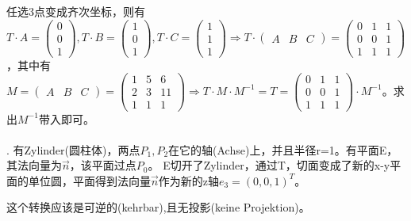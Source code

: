 \documentclass[fleqn]{article}
\begin{document}
任选3点变成齐次坐标，则有$T\cdot A = \begin{pmatrix}
    0\\0\\1
\end{pmatrix}, T\cdot B = \begin{pmatrix}
    1\\0\\1
\end{pmatrix},T\cdot C=\begin{pmatrix}
    1\\1\\1
\end{pmatrix}\Rightarrow T\cdot \begin{pmatrix}
    A&B&C
\end{pmatrix}=\begin{pmatrix}
    0&1&1\\
    0&0&1\\
    1&1&1
\end{pmatrix}$，其中有$M=\begin{pmatrix}
    A&B&C
\end{pmatrix}=\begin{pmatrix}
    1&5&6\\
    2&3&11\\
    1&1&1
\end{pmatrix}\Rightarrow T\cdot M\cdot M^{-1}=T=\begin{pmatrix}
    0&1&1\\
    0&0&1\\
    1&1&1
\end{pmatrix}\cdot M^{-1}$。求出$M^{-1}$带入即可。
\\
\\
. 有Zylinder(圆柱体)，两点$P_1,P_2$在它的轴(Achse)上，并且半径r=1。有平面E，其法向量为$\vec{n}$，该平面过点$P_0$。
E切开了Zylinder，通过T，切面变成了新的x-y平面的单位圆，平面得到法向量$\vec{n}$作为新的z轴$e_3=(0,0,1)^T$。

这个转换应该是可逆的(kehrbar),且无投影(keine Projektion)。
\end{document}
